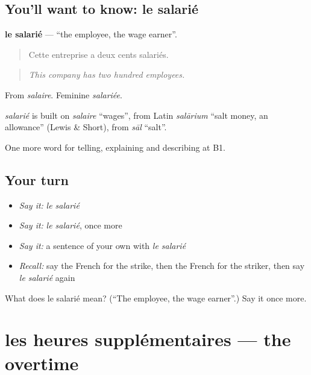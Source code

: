 \subsection*{You'll want to know: le salarié}
\textbf{le salarié} — \textquotedblleft{}the employee, the wage earner\textquotedblright{}.

\begin{quote}
Cette entreprise a deux cents salariés.
\end{quote}

\begin{quote}
\emph{This company has two hundred employees.}
\end{quote}

From \emph{salaire}. Feminine \emph{salariée}.

\begin{cousinweb}
\emph{salarié} is built on \emph{salaire} \textquotedblleft{}wages\textquotedblright{}, from Latin \emph{salārium} \textquotedblleft{}salt money, an allowance\textquotedblright{} (Lewis \& Short), from \emph{sāl} \textquotedblleft{}salt\textquotedblright{}.
\end{cousinweb}

\begin{grammarlens}[title={What you've built}]
One more word for telling, explaining and describing at B1.
\end{grammarlens}

\subsection*{Your turn}
\begin{itemize}
\raggedright
  \item \emph{Say it:} \emph{le salarié}
  \item \emph{Say it:} \emph{le salarié}, once more
  \item \emph{Say it:} a sentence of your own with \emph{le salarié}
  \item \emph{Recall:} say the French for the strike, then the French for the striker, then say \emph{le salarié} again
\end{itemize}

\begin{tcolorbox}[breakable,colback=teal!4,colframe=teal!35!black,title={Before you move on}]
What does le salarié mean? (\textquotedblleft{}The employee, the wage earner\textquotedblright{}.) Say it once more.
\end{tcolorbox}
\section[les heures supplémentaires]{les heures supplémentaires — the overtime}

